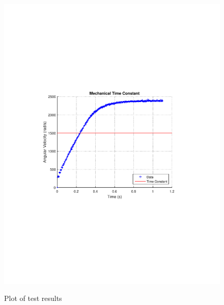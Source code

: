 \begin{figure}[H]
  \centering
  {
    \includegraphics[width=\textwidth]{figures/mechanicalTimeConstant.pdf}
  }
	\caption{Plot of test results}
\end{figure}

